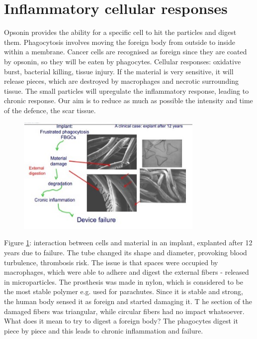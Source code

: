 \section{Inflammatory cellular responses}
Opsonin provides the ability for a specific cell to hit the particles and digest them. Phagocytosis involves moving the foreign body from outside to inside within a membrane.
Cancer cells are recognised as foreign since they are coated by opsonin, so they will be eaten by phagocytes.  
Cellular responses: oxidative burst, bacterial killing, tissue injury. 
If the material is very sensitive, it will release pieces, which are destroyed by macrophages and necrotic surrounding tissue. 
The small particles will upregulate the inflammatory response, leading to chronic response. 
Our aim is to reduce as much as possible the intensity and time of the defence, the scar tissue.

\begin{figure}[ht]
\includegraphics[width=0.8\textwidth]{failure}
\caption{\label{fig:failure}}
\end{figure}
\noindent
Figure \ref{fig:failure}: interaction between cells and material in an implant, explanted after 12 years due to failure.  
The tube changed its shape and diameter, provoking blood turbulence, thrombosis risk. 
The issue is that spaces were occupied by macrophages, which were able to adhere and digest the external fibers - released in microparticles. 
The prosthesis was made in nylon, which is considered to be the most stable polymer e.g. used for parachutes. 
Since it is stable and strong, the human body sensed it as foreign and started damaging it. T
he section of the damaged fibers was triangular, while circular fibers had no impact whatsoever. 
What does it mean to try to digest a foreign body? The phagocytes digest it piece by piece and this leads to chronic inflammation and failure.

